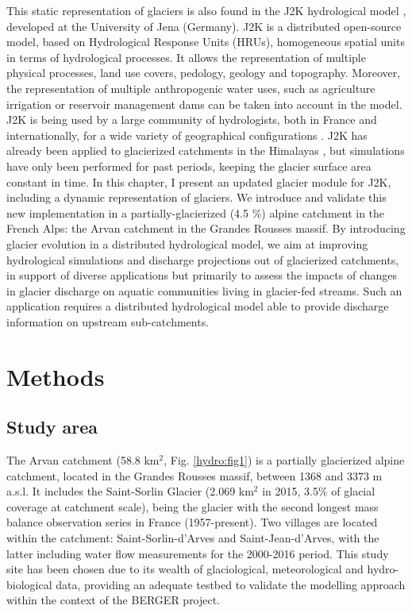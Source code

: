 This static representation of glaciers is also found in the J2K hydrological model \citep{krause_quantifying_2002}, developed at the University of Jena (Germany). J2K is a distributed open-source model, based on Hydrological Response Units (HRUs), homogeneous spatial units in terms of hydrological processes. It allows the representation of multiple physical processes, land use covers, pedology, geology and topography. Moreover, the representation of multiple anthropogenic water uses, such as agriculture irrigation or reservoir management dams can be taken into account in the model. J2K is being used by a large community of hydrologists, both in France and internationally, for a wide variety of geographical configurations \citep{krause_quantifying_2002, nepal_understanding_2014, braud_j2000-rhone_2017}. J2K has already been applied to glacierized catchments in the Himalayas \citep{nepal_understanding_2014}, but simulations have only been performed for past periods, keeping the glacier surface area constant in time. In this chapter, I present an updated glacier module for J2K, including a dynamic representation of glaciers. We introduce and validate this new implementation in a partially-glacierized (4.5 \%) alpine catchment in the French Alps: the Arvan catchment in the Grandes Rousses massif. By introducing glacier evolution in a distributed hydrological model, we aim at improving hydrological simulations and discharge projections out of glacierized catchments, in support of diverse applications but primarily to assess the impacts of changes in glacier discharge on aquatic communities living in glacier-fed streams. Such an application requires a distributed hydrological model able to provide discharge information on upstream sub-catchments. 

\section{Methods}

\subsection{Study area}

The Arvan catchment (58.8 km$^{2}$, Fig. \ref{hydro:fig1}) is a partially glacierized alpine catchment, located in the Grandes Rousses massif, between 1368 and 3373 m a.s.l. It includes the Saint-Sorlin Glacier (2.069 km$^{2}$ in 2015, 3.5\% of glacial coverage at catchment scale), being the glacier with the second longest mass balance observation series in France (1957-present). Two villages are located within the catchment: Saint-Sorlin-d'Arves and Saint-Jean-d'Arves, with the latter including water flow measurements for the 2000-2016 period. This study site has been chosen due to its wealth of glaciological, meteorological and hydro-biological data, providing an adequate testbed to validate the modelling approach within the context of the BERGER project.

